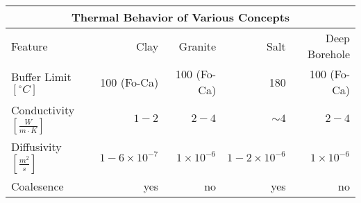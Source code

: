 %
\begin{table}[h!]
  \centering
  \footnotesize{
  \begin{tabular}{|l|r|r|r|r|}
    \multicolumn{5}{c}{\textbf{Thermal Behavior of Various Concepts}}\\
    \hline
    Feature & Clay & Granite & Salt & Deep Borehole \\ 
    \hline
    Buffer Limit $[^{\circ}C]$ & 100 (Fo-Ca) & 100 (Fo-Ca) & 180 & 100 (Fo-Ca) \\ 
    Conductivity $[\frac{W}{m{\cdot}K}]$ & $1-2$ & $2-4$ & $\sim4$  & $2-4$ \\ 
    Diffusivity $[\frac{m^2}{s}]$ & $1-6\times10^{-7}$ & $1\times10^{-6}$ & $1-2\times10^{-6}$  & $1\times10^{-6}$ \\ 
    Coalesence & yes & no & yes & no \\ 
    \hline
  \end{tabular}
  }
  \label{tab:geos_tab}
\end{table}
